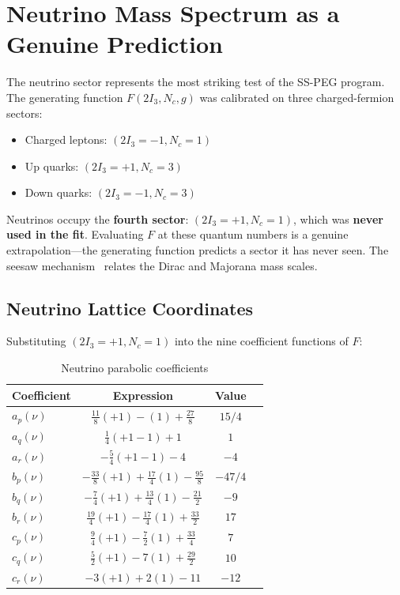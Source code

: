 \section{Neutrino Mass Spectrum as a Genuine Prediction}\label{sec:neutrino_spectrum}

The neutrino sector represents the most striking test of the SS-PEG program. The generating function $F(2I_3, N_c, g)$ was calibrated on three charged-fermion sectors:
\begin{itemize}
\item Charged leptons: $(2I_3 = -1, N_c = 1)$
\item Up quarks: $(2I_3 = +1, N_c = 3)$
\item Down quarks: $(2I_3 = -1, N_c = 3)$
\end{itemize}

Neutrinos occupy the \textbf{fourth sector}: $(2I_3 = +1, N_c = 1)$, which was \textbf{never used in the fit}. Evaluating $F$ at these quantum numbers is a genuine extrapolation---the generating function predicts a sector it has never seen. The seesaw mechanism~\cite{maki1962,pontecorvo1967} relates the Dirac and Majorana mass scales.

\subsection{Neutrino Lattice Coordinates}\label{sec:neutrino_coordinates}

Substituting $(2I_3 = +1, N_c = 1)$ into the nine coefficient functions of $F$:

\begin{table}[h]
\centering
\caption{Neutrino parabolic coefficients}
\label{tab:neutrino_coeffs}
\begin{tabular}{lccc}
\hline\hline
Coefficient & Expression & Value \\
\hline
$a_p(\nu)$ & $\frac{11}{8}(+1) - (1) + \frac{27}{8}$ & $15/4$ \\
$a_q(\nu)$ & $\frac{1}{4}(+1 - 1) + 1$ & $1$ \\
$a_r(\nu)$ & $-\frac{5}{4}(+1 - 1) - 4$ & $-4$ \\
$b_p(\nu)$ & $-\frac{33}{8}(+1) + \frac{17}{4}(1) - \frac{95}{8}$ & $-47/4$ \\
$b_q(\nu)$ & $-\frac{7}{4}(+1) + \frac{13}{4}(1) - \frac{21}{2}$ & $-9$ \\
$b_r(\nu)$ & $\frac{19}{4}(+1) - \frac{17}{4}(1) + \frac{33}{2}$ & $17$ \\
$c_p(\nu)$ & $\frac{9}{4}(+1) - \frac{7}{2}(1) + \frac{33}{4}$ & $7$ \\
$c_q(\nu)$ & $\frac{5}{2}(+1) - 7(1) + \frac{29}{2}$ & $10$ \\
$c_r(\nu)$ & $-3(+1) + 2(1) - 11$ & $-12$ \\
\hline\hline
\end{tabular}
\end{table}

